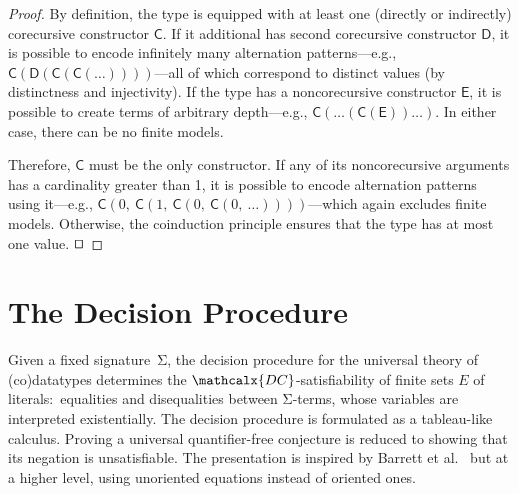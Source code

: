 \documentclass[smallcondensed,draft]{svjour3}
\newcommand\Sig{\mathrm{\Sigma}}
\newcommand\const[1]{\textsf{#1}}
\newcommand\xqed{{\hfill$\scriptstyle\squareforqed$}}
\newcommand{\Ec}{E}
\newcommand{\thD}{\mathcalx{DC}}
\begin{document}
\begin{proof}
By definition, the type is equipped with at least one (directly or indirectly)
corecursive constructor $\const{C}$. If it additional has second
corecursive constructor $\const{D}$, it is possible to encode infinitely many
alternation patterns---e.g.,
$\const{C}(\const{D}(\const{C}(\const{C}(\ldots))))$---all of which correspond
to distinct values (by distinctness and injectivity). If the type has a
noncorecursive constructor $\const{E}$, it is possible to create terms of
arbitrary depth---e.g., $\const{C}(\ldots(\const{C}(\const{E}))\ldots)$. In
either case, there can be no finite models.

Therefore, $\const{C}$ must be the only constructor.
If any of its noncorecursive arguments has a cardinality greater than 1,
it is possible to encode alternation patterns using it---e.g.,
$\const{C}(0,\: \const{C}(1,\: \const{C}(0,\: \const{C}(0,\: \ldots))))$---which
again excludes finite models. Otherwise, the coinduction principle ensures
that the type has at most one value.
\xqed
\end{proof}


\section{The Decision Procedure} %
\label{sec:the-decision-procedure}

Given a fixed signature~$\Sig$,
the decision procedure for the universal theory of (co)data\-types %
determines the
$\thD$-satisfiability of finite sets $\Ec$ of literals:\ equalities
and disequalities between $\Sig$-terms,
whose variables are interpreted existentially.
The decision procedure is formulated as a tableau-like calculus.
Proving a universal quantifier-free conjecture is reduced to showing that
its negation is unsatisfiable. The presentation is
inspired by Barrett et al.\ \cite{barrett-et-al-2007} but at
a higher level, using unoriented equations instead of oriented ones.
\end{document}
